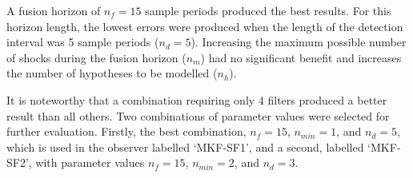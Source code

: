 
A fusion horizon of $n_f=15$ sample periods produced the best results. For this horizon length, the lowest errors were produced when the length of the detection interval was 5 sample periods ($n_d=5$). Increasing the maximum possible number of shocks during the fusion horizon ($n_m$) had no significant benefit and increases the number of hypotheses to be modelled ($n_h$).

It is noteworthy that a combination requiring only 4 filters produced a better result than all others. Two combinations of parameter values were selected for further evaluation. Firstly, the best combination, $n_f=15$, $n_{min}=1$, and $n_d=5$, which is used in the observer labelled `MKF-SF1', and a second, labelled `MKF-SF2', with parameter values $n_f=15$, $n_{min}=2$, and $n_d=3$.

